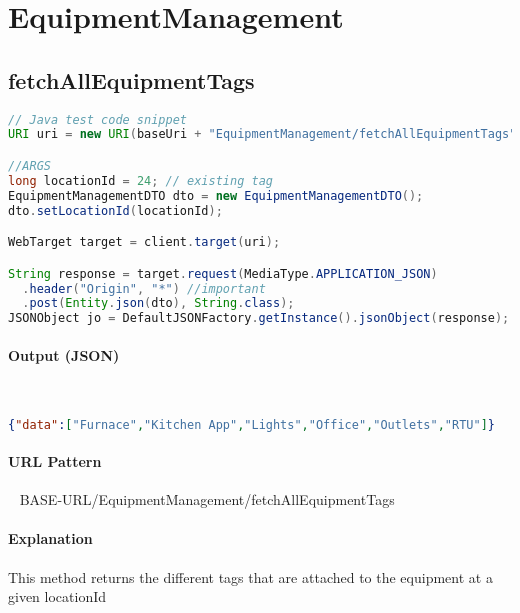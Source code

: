 \documentclass[
10pt, %
letterpaper, %
oneside, %
headinclude,footinclude, %
BCOR5mm, %
]{scrartcl}
\begin{document}

\section{EquipmentManagement}


\subsection{\textbf{fetchAllEquipmentTags}}

\begin{lstlisting}[language=Java]
// Java test code snippet
URI uri = new URI(baseUri + "EquipmentManagement/fetchAllEquipmentTags");        

//ARGS
long locationId = 24; // existing tag
EquipmentManagementDTO dto = new EquipmentManagementDTO();
dto.setLocationId(locationId);

WebTarget target = client.target(uri);

String response = target.request(MediaType.APPLICATION_JSON)
  .header("Origin", "*") //important
  .post(Entity.json(dto), String.class);
JSONObject jo = DefaultJSONFactory.getInstance().jsonObject(response);
\end{lstlisting}

\paragraph{Output (JSON)} ~
\begin{lstlisting}[language=json]
{"data":["Furnace","Kitchen App","Lights","Office","Outlets","RTU"]}
\end{lstlisting}

\paragraph{URL Pattern} 
~\newline
BASE-URL/EquipmentManagement/fetchAllEquipmentTags

\paragraph{Explanation} This method returns the different tags that are attached to the equipment at a given locationId


\end{document}
